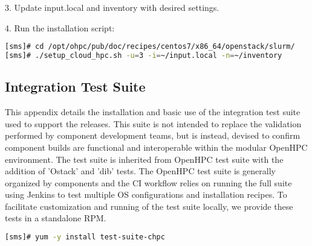 3. Update input.local and inventory with desired settings.

4. Run the installation script:

\begin{lstlisting}[language=bash,keywords={},upquote=true]
[sms]# cd /opt/ohpc/pub/doc/recipes/centos7/x86_64/openstack/slurm/
[sms]# ./setup_cloud_hpc.sh -u=3 -i=~/input.local -n=~/inventory
\end{lstlisting}


\newpage
\subsection{Integration Test Suite}
	

This appendix details the installation and basic use of the integration test suite used to support the releases. This suite is not intended to replace the validation performed by component development teams, but is instead, devised to confirm component builds are functional and interoperable within the modular OpenHPC environment. The test suite is inherited from OpenHPC test suite with the addition of 'Ostack' and 'dib' tests. The OpenHPC test suite is generally organized by components and the CI workflow relies on running the full suite using Jenkins to test multiple OS configurations and installation recipes. To facilitate customization and running of the test suite locally, we provide these tests in a standalone RPM.
\begin{lstlisting}[language=bash,keywords={},upquote=true]
[sms]# yum -y install test-suite-chpc
\end{lstlisting}

